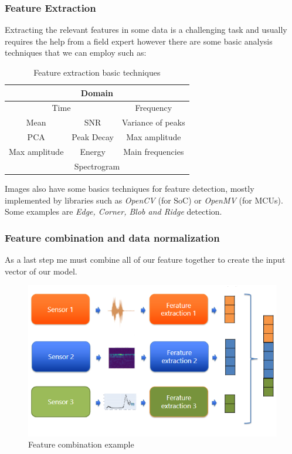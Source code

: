 \documentclass{article}
\begin{document}
      \subsubsection{Feature Extraction}
        Extracting the relevant features in some data is a challenging task and usually requires the help from a field expert however there are some basic analysis techniques that we can employ such as:
        \begin{table}[H]
          \centering
          \begin{tabular}{ccc}
            \hline
            \multicolumn{3}{c}{Domain}                                          \\ \hline
            \multicolumn{2}{c|}{Time}                       & Frequency         \\ \hline
            Mean          & \multicolumn{1}{c|}{SNR}        & Variance of peaks \\
            PCA           & \multicolumn{1}{c|}{Peak Decay} & Max amplitude     \\
            Max amplitude & \multicolumn{1}{c|}{Energy}     & Main frequencies  \\ \hline
            \multicolumn{3}{c}{Spectrogram}                                     \\ \hline
          \end{tabular}
          \caption{Feature extraction basic techniques}
        \end{table}

        Images also have some basics techniques for feature detection, mostly implemented by libraries such as \emph{OpenCV} (for SoC) or \emph{OpenMV} (for MCUs). Some examples are \emph{Edge, Corner, Blob and Ridge} detection.
        
      \subsubsection{Feature combination and data normalization} 
        As a last step me must combine all of our feature together to create the input vector of our model.
        \begin{figure}[H]
          \includegraphics[scale=0.55]{../Images/Feature_combination.png}
          \centering
          \caption{Feature combination example}
        \end{figure}
\end{document}
